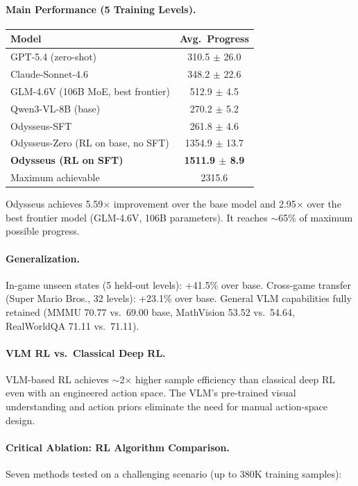 \documentclass[11pt]{article}
\begin{document}
\paragraph{Main Performance (5 Training Levels).}

\begin{center}
\begin{tabular}{lc}
\toprule
\textbf{Model} & \textbf{Avg.\ Progress} \\
\midrule
GPT-5.4 (zero-shot) & 310.5 $\pm$ 26.0 \\
Claude-Sonnet-4.6 & 348.2 $\pm$ 22.6 \\
GLM-4.6V (106B MoE, best frontier) & 512.9 $\pm$ 4.5 \\
Qwen3-VL-8B (base) & 270.2 $\pm$ 5.2 \\
Odysseus-SFT & 261.8 $\pm$ 4.6 \\
Odysseus-Zero (RL on base, no SFT) & 1354.9 $\pm$ 13.7 \\
\textbf{Odysseus (RL on SFT)} & \textbf{1511.9 $\pm$ 8.9} \\
\midrule
Maximum achievable & 2315.6 \\
\bottomrule
\end{tabular}
\end{center}

Odysseus achieves 5.59$\times$ improvement over the base model and 2.95$\times$ over the best frontier model (GLM-4.6V, 106B parameters). It reaches $\sim$65\% of maximum possible progress.

\paragraph{Generalization.}
In-game unseen states (5 held-out levels): +41.5\% over base. Cross-game transfer (Super Mario Bros., 32 levels): +23.1\% over base. General VLM capabilities fully retained (MMMU 70.77 vs.\ 69.00 base, MathVision 53.52 vs.\ 54.64, RealWorldQA 71.11 vs.\ 71.11).

\paragraph{VLM RL vs.\ Classical Deep RL.}
VLM-based RL achieves $\sim$2$\times$ higher sample efficiency than classical deep RL even with an engineered action space. The VLM's pre-trained visual understanding and action priors eliminate the need for manual action-space design.

\paragraph{Critical Ablation: RL Algorithm Comparison.}
Seven methods tested on a challenging scenario (up to 380K training samples):
\end{document}
